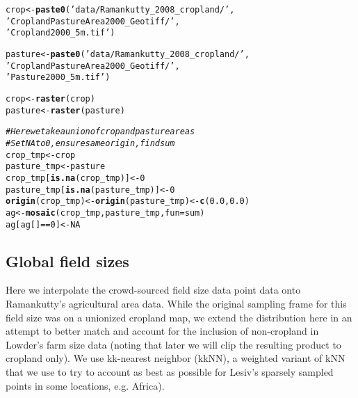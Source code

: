 \documentclass{article}\usepackage[]{graphicx}\usepackage[]{xcolor}
\makeatletter
\newcommand{\hlnum}[1]{\textcolor[rgb]{0.686,0.059,0.569}{#1}}%
\newcommand{\hlstr}[1]{\textcolor[rgb]{0.192,0.494,0.8}{#1}}%
\newcommand{\hlcom}[1]{\textcolor[rgb]{0.678,0.584,0.686}{\textit{#1}}}%
\newcommand{\hlopt}[1]{\textcolor[rgb]{0,0,0}{#1}}%
\newcommand{\hlstd}[1]{\textcolor[rgb]{0.345,0.345,0.345}{#1}}%
\newcommand{\hlkwb}[1]{\textcolor[rgb]{0.69,0.353,0.396}{#1}}%
\newcommand{\hlkwc}[1]{\textcolor[rgb]{0.333,0.667,0.333}{#1}}%
\newcommand{\hlkwd}[1]{\textcolor[rgb]{0.737,0.353,0.396}{\textbf{#1}}}%
\newenvironment{kframe}{%
 \def\at@end@of@kframe{}%
 \ifinner\ifhmode%
  \def\at@end@of@kframe{\end{minipage}}%
  \begin{minipage}{\columnwidth}%
 \fi\fi%
 \def\FrameCommand##1{\hskip\@totalleftmargin \hskip-\fboxsep
 \colorbox{shadecolor}{##1}\hskip-\fboxsep
     \hskip-\linewidth \hskip-\@totalleftmargin \hskip\columnwidth}%
 \MakeFramed {\advance\hsize-\width
   \@totalleftmargin\z@ \linewidth\hsize
   \@setminipage}}%
 {\par\unskip\endMakeFramed%
 \at@end@of@kframe}
\newenvironment{knitrout}{}{} %
\makeatother
\begin{document}
\begin{knitrout}
\color{fgcolor}\begin{kframe}
\begin{alltt}
\hlstd{crop} \hlkwb{<-} \hlkwd{paste0}\hlstd{(}\hlstr{'data/Ramankutty_2008_cropland/'}\hlstd{,}
                \hlstr{'CroplandPastureArea2000_Geotiff/'}\hlstd{,}
                \hlstr{'Cropland2000_5m.tif'}\hlstd{)}

\hlstd{pasture} \hlkwb{<-} \hlkwd{paste0}\hlstd{(}\hlstr{'data/Ramankutty_2008_cropland/'}\hlstd{,}
                  \hlstr{'CroplandPastureArea2000_Geotiff/'}\hlstd{,}
                  \hlstr{'Pasture2000_5m.tif'}\hlstd{)}

\hlstd{crop} \hlkwb{<-} \hlkwd{raster}\hlstd{(crop)}
\hlstd{pasture} \hlkwb{<-} \hlkwd{raster}\hlstd{(pasture)}

\hlcom{# Here we take a union of crop and pasture areas}
\hlcom{# Set NA to 0, ensure same origin, find sum }
\hlstd{crop_tmp} \hlkwb{<-} \hlstd{crop}
\hlstd{pasture_tmp} \hlkwb{<-} \hlstd{pasture}
\hlstd{crop_tmp[}\hlkwd{is.na}\hlstd{(crop_tmp)]} \hlkwb{<-} \hlnum{0}
\hlstd{pasture_tmp[}\hlkwd{is.na}\hlstd{(pasture_tmp)]} \hlkwb{<-} \hlnum{0}
\hlkwd{origin}\hlstd{(crop_tmp)} \hlkwb{<-} \hlkwd{origin}\hlstd{(pasture_tmp)} \hlkwb{<-} \hlkwd{c}\hlstd{(}\hlnum{0.0}\hlstd{,} \hlnum{0.0}\hlstd{)}
\hlstd{ag} \hlkwb{<-}\hlkwd{mosaic}\hlstd{(crop_tmp, pasture_tmp,} \hlkwc{fun} \hlstd{= sum)}
\hlstd{ag[ag[]} \hlopt{==} \hlnum{0}\hlstd{]} \hlkwb{<-} \hlnum{NA}
\end{alltt}
\end{kframe}
\end{knitrout}

\subsection{Global field sizes}

Here we interpolate the crowd-sourced field size data point data onto Ramankutty's agricultural area data. While the original sampling frame for this field size was on a unionized cropland map, we extend the distribution here in an attempt to better match and account for the inclusion of non-cropland in Lowder's farm size data (noting that later we will clip the resulting product to cropland only). We use kk-nearest neighbor (kkNN), a weighted variant of kNN that we use to try to account as best as possible for Lesiv’s sparsely sampled points in some locations, e.g. Africa).
\end{document}

